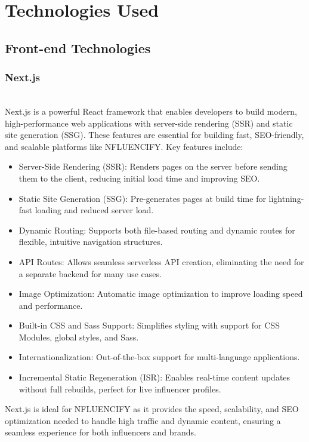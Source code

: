\chapter{Technologies Used}
\begin{justify}
    
\section{Front-end Technologies}
\subsection{Next.js} \\
Next.js is a powerful React framework that enables developers to build modern, high-performance web applications with server-side rendering (SSR) and static site generation (SSG). These features are essential for building fast, SEO-friendly, and scalable platforms like NFLUENCIFY. Key features include:
\begin{itemize}
    \item Server-Side Rendering (SSR): Renders pages on the server before sending them to the client, reducing initial load time and improving SEO.
    \item 	Static Site Generation (SSG): Pre-generates pages at build time for lightning-fast loading and reduced server load.
    \item 	Dynamic Routing: Supports both file-based routing and dynamic routes for flexible, intuitive navigation structures.
    \item 	API Routes: Allows seamless serverless API creation, eliminating the need for a separate backend for many use cases.
    \item 	Image Optimization: Automatic image optimization to improve loading speed and performance.
    \item 	Built-in CSS and Sass Support: Simplifies styling with support for CSS Modules, global styles, and Sass.
    \item 	Internationalization: Out-of-the-box support for multi-language applications.
    \item 	Incremental Static Regeneration (ISR): Enables real-time content updates without full rebuilds, perfect for live influencer profiles.
\end{itemize}
Next.js is ideal for NFLUENCIFY as it provides the speed, scalability, and SEO optimization needed to handle high traffic and dynamic content, ensuring a seamless experience for both influencers and brands.
\par


\end{justify}
